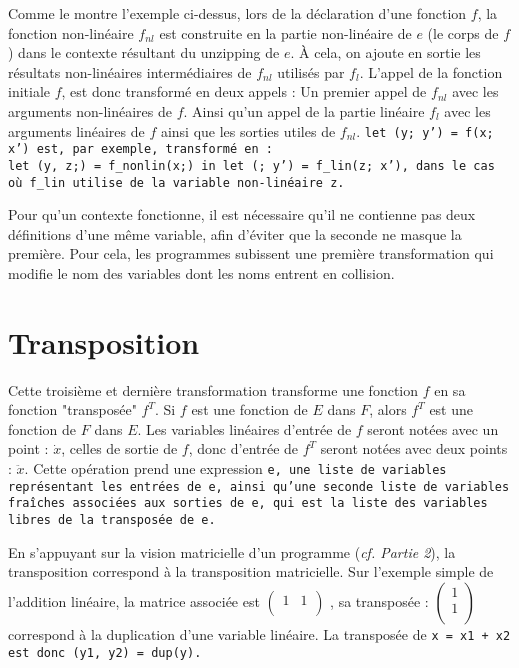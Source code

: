 \documentclass[a4paper, french, 11pt]{article}
\begin{document}
Comme le montre l'exemple ci-dessus, lors de la déclaration d'une fonction $f$, la fonction non-linéaire $f_{nl}$ est construite en la partie non-linéaire de $e$ (le corps de $f$) dans le contexte résultant du unzipping de $e$. À cela, on ajoute en sortie les résultats non-linéaires intermédiaires de $f_{nl}$ utilisés par $f_l$. L'appel de la fonction initiale $f$, est donc transformé en deux appels : Un premier appel de $f_{nl}$ avec les arguments non-linéaires de $f$. Ainsi qu'un appel de la partie linéaire $f_l$ avec les arguments linéaires de $f$ ainsi que les sorties utiles de $f_{nl}$.
\tt let (y; y') = f(x; x') \rm
est, par exemple, transformé en :\\
\tt let (y, z;) = f\_nonlin(x;) in let (; y') = f\_lin(z; x')\rm, dans le cas où \tt f\_lin \rm utilise de la variable non-linéaire \tt z\rm.


Pour qu'un contexte fonctionne, il est nécessaire qu'il ne contienne pas deux définitions d'une même variable, afin d'éviter que la seconde ne masque la première. Pour cela, les programmes subissent une première transformation qui modifie le nom des variables dont les noms entrent en collision.




\section{Transposition}

Cette troisième et dernière transformation transforme une fonction $f$ en sa fonction "transposée" $f^T$. Si $f$ est une fonction de $E$ dans $F$, alors $f^T$ est une fonction de $F$ dans $E$. Les variables linéaires d'entrée de $f$ seront notées avec un point : $\dot x$, celles de sortie de $f$, donc d'entrée de $f^T$ seront notées avec deux points : $\ddot x$. Cette opération prend une expression \tt e\rm, une liste de variables représentant les entrées de \tt e\rm, ainsi qu'une seconde liste de variables fraîches associées aux sorties de \tt e\rm, qui est la liste des variables libres de la transposée de \tt e\rm.

En s'appuyant sur la vision matricielle d'un programme (\textit{cf. Partie 2}), la transposition correspond à la transposition matricielle. Sur l'exemple simple de l'addition linéaire, la matrice associée est
$\begin{pmatrix}
  1&1\\
\end{pmatrix}$
, sa transposée : 
$\begin{pmatrix}
  1\\
  1\\
\end{pmatrix}$
 correspond à la duplication d'une variable linéaire. La transposée de \tt x = x1 + x2 \rm est donc \tt (y1, y2) = dup(y)\rm.
\end{document}
